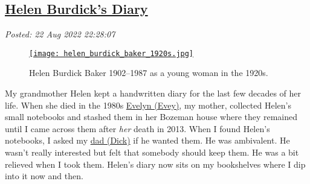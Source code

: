 %

\subsection*{\href{https://analyzethedatanotthedrivel.org/2022/08/22/helen-burdicks-diary/}{Helen Burdick's Diary}}

\noindent\emph{Posted: 22 Aug 2022 22:28:07}
\vspace{6pt}

\captionsetup[figure]{labelformat=empty}
\begin{SCfigure}
\centering
\href{https://conceptcontrol.smugmug.com/People/Grandparents-1/i-nBLh69S/A}{\texttt{[image: helen\_burdick\_baker\_1920s.jpg]}}
\caption[Helen Burdick Baker 1902--1987]{Helen Burdick Baker 1902--1987 as a young woman in the 1920s.}
\label{fig:7491x0}
\end{SCfigure}
 


My grandmother Helen kept a handwritten diary for the last few decades
of her life. When she died in the 1980s \href{https://conceptcontrol.smugmug.com/People/The-Way-We-Were/i-HwPZXV9/A}{Evelyn (Evey)}, my mother,
collected Helen's small notebooks and stashed them in her Bozeman house
where they remained until I came across them after \emph{her} death in
2013. When I found Helen's notebooks, I asked my \href{https://conceptcontrol.smugmug.com/People/The-Way-We-Were/i-zKPBhVk/A}{dad (Dick)} if he wanted
them. He was ambivalent. He wasn't really interested but felt that
somebody should keep them. He was a bit relieved when I took them.
Helen's diary now sits on my bookshelves where I dip into it now and
then.


